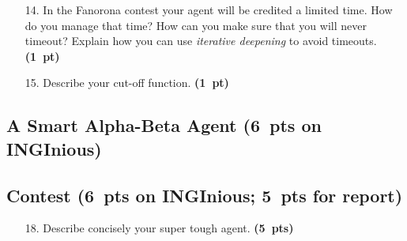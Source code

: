 \documentclass[11pt,a4paper]{report}
\begin{document}
\begin{enumerate}
\item[14.] In the Fanorona contest your agent will be credited a limited time.
How do you manage that time? How can you make sure that you will never timeout?
Explain how you can use \emph{iterative deepening} to avoid timeouts. \textbf{(1~pt)}
\end{enumerate}

\begin{answers}[10cm]
\end{answers}






\begin{enumerate}
\item[15.] Describe your cut-off function. \textbf{(1~pt)}
\end{enumerate}

\begin{answers}[9cm]
\end{answers}





\clearpage
\subsection{A Smart Alpha-Beta Agent (6~pts on INGInious)}
\medskip

\subsection{Contest (6~pts on INGInious; 5~pts for report)}


\begin{enumerate}
\item[18.] Describe concisely your super tough agent. \textbf{(5~pts)}
\end{enumerate}

\begin{answers}[20cm]
\end{answers}

\begin{answers}[23cm]
\end{answers}
\end{document}
